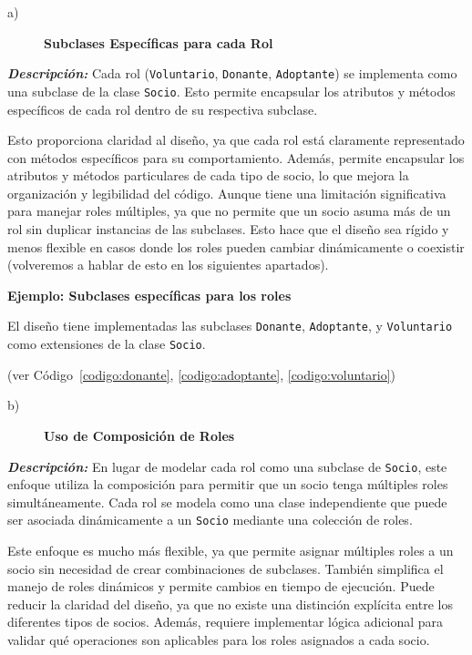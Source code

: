 \begin{description}
    \item[a)] \textbf{Subclases Específicas para cada Rol}
\end{description}

\textit{\textbf{Descripción:}}  
Cada rol (\texttt{Voluntario}, \texttt{Donante}, \texttt{Adoptante}) se implementa como una 
subclase de la clase \texttt{Socio}. Esto permite encapsular los atributos y métodos 
específicos de cada rol dentro de su respectiva subclase.
\vspace{0.15cm}


Esto proporciona claridad al diseño, ya que cada rol está claramente representado con 
métodos específicos para su comportamiento. Además, permite encapsular los atributos y 
métodos particulares de cada tipo de socio, lo que mejora la organización y legibilidad 
del código. Aunque tiene una limitación significativa para manejar roles múltiples, ya que no permite que 
un socio asuma más de un rol sin duplicar instancias de las subclases. Esto hace que el 
diseño sea rígido y menos flexible en casos donde los roles pueden cambiar dinámicamente 
o coexistir (volveremos a hablar de esto en los siguientes apartados).\par
\vspace{0.15cm}



\textbf{Ejemplo: Subclases específicas para los roles}\par
El diseño tiene implementadas las subclases \texttt{Donante}, \texttt{Adoptante}, 
y \texttt{Voluntario} como extensiones de la clase \texttt{Socio}.\par
(ver Código~\ref{codigo:donante}, \ref{codigo:adoptante}, \ref{codigo:voluntario})

\begin{description}
    \item[b)] \textbf{Uso de Composición de Roles}
\end{description}

\textit{\textbf{Descripción:}}  
En lugar de modelar cada rol como una subclase de \texttt{Socio}, este enfoque utiliza 
la composición para permitir que un socio tenga múltiples roles simultáneamente. 
Cada rol se modela como una clase independiente que puede ser asociada dinámicamente a 
un \texttt{Socio} mediante una colección de roles.
\vspace{0.15cm}


Este enfoque es mucho más flexible, ya que permite asignar múltiples roles a un socio 
sin necesidad de crear combinaciones de subclases. También simplifica el manejo de 
roles dinámicos y permite cambios en tiempo de ejecución.
Puede reducir la claridad del diseño, ya que no existe una distinción explícita entre 
los diferentes tipos de socios. Además, requiere implementar lógica adicional para 
validar qué operaciones son aplicables para los roles asignados a cada socio.\par
\vspace{0.15cm}


